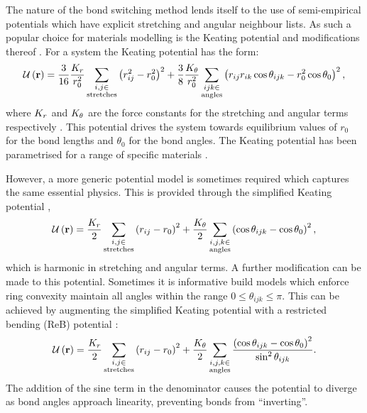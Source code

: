 The nature of the bond switching method lends itself to the use of semi\--empirical potentials which have explicit stretching and angular neighbour lists.
As such a popular choice for materials modelling is the Keating potential and modifications thereof \cite{Keating1966,Barkema2000}. 
For a \td{} system the Keating potential has the form:
\begin{equation}
	\label{eq:keating}
	\mathcal{U}\left(\mathbf{r}\right) = \frac{3}{16}\frac{K_r}{r_0^2}\sum_{\substack{i,j \in \\ \text{stretches}}} \left(r_{ij}^2-r_0^2\right)^2+
	\frac{3}{8}\frac{K_\theta}{r_0^2}\sum_{\substack{ijk \in \\ \text{angles}}}\left(r_{ij}r_{ik}\cos\theta_{ijk}-r_0^2\cos\theta_0\right)^2 ,
\end{equation}
where $K_r$ and $K_\theta$ are the force constants for the stretching and angular terms respectively \cite{Kumar2012}.
This potential drives the system towards equilibrium values of $r_0$ for the bond lengths and $\theta_0$ for the bond angles.
The Keating potential has been parametrised for a range of specific materials \cite{Kumar2012,Drabold2009}. 

However, a more generic potential model is sometimes required which captures the same essential physics.
This is provided through the simplified Keating potential \cite{VonAlfthan2003},
\begin{equation}
	\mathcal{U}\left(\mathbf{r}\right) = \frac{K_r}{2}\sum_{\substack{i,j\in \\ \text{stretches}}}\left(r_{ij}-r_0\right)^2 + \frac{K_\theta}{2}\sum_{\substack{i,j,k \in \\ \text{angles}}} \left(\cos\theta_{ijk}-\cos\theta_0\right)^2,
\end{equation}
which is harmonic in stretching and angular terms.
A further modification can be made to this potential. 
Sometimes it is informative build models which enforce ring convexity \ie{} maintain all angles within the range $0\leq \theta_{ijk} \leq \pi$.
This can be achieved by augmenting the simplified Keating potential with a restricted bending (ReB) potential \cite{Bulacu2013}:
\begin{equation}
	\mathcal{U}\left(\mathbf{r}\right) = \frac{K_r}{2}\sum_{\substack{i,j\in \\ \text{stretches}}}\left(r_{ij}-r_0\right)^2 + \frac{K_\theta}{2}\sum_{\substack{i,j,k \in \\ \text{angles}}} \frac{\left(\cos\theta_{ijk}-\cos\theta_0\right)^2}{\sin^{2}\theta_{ijk}}.
\end{equation}
The addition of the sine term in the denominator causes the potential to diverge as bond angles approach linearity, preventing bonds from ``inverting''.

